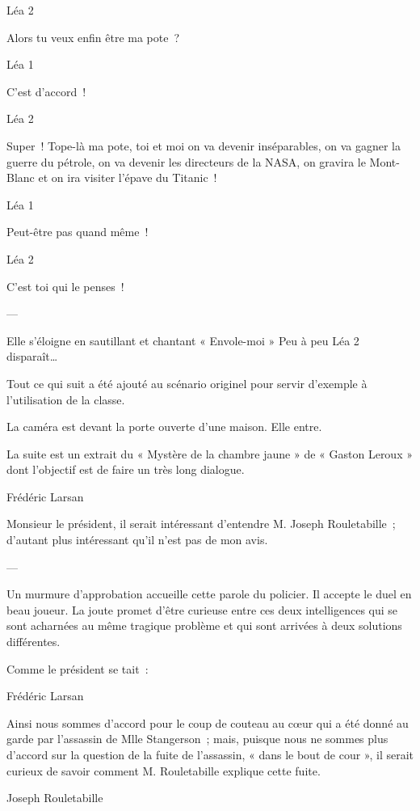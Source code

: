 \documentclass{frscenario}
\begin{document}
\— Léa 2

Alors tu veux enfin être ma pote ?

\— Léa 1

C’est d’accord !

\— Léa 2

Super ! Tope-là ma pote, toi et moi on va devenir inséparables, on va gagner la guerre du pétrole, on va devenir les directeurs de la NASA, on gravira le Mont-Blanc et on ira visiter l’épave du Titanic !

\— Léa 1

Peut-être pas quand même !

\— Léa 2

C’est toi qui le penses !

\——

Elle s’éloigne en sautillant et chantant « Envole-moi » Peu à peu Léa 2 disparaît…


Tout ce qui suit a été ajouté au scénario originel pour servir d'exemple à l'utilisation de la classe.

La caméra est devant la porte ouverte d'une maison. Elle entre.

La suite est un extrait du « Mystère de la chambre jaune » de « Gaston Leroux » dont l'objectif est de faire un très long dialogue.


\— Frédéric Larsan

Monsieur le président, il serait intéressant d’entendre M. Joseph Rouletabille ; d’autant plus intéressant qu’il n’est pas de mon avis.

\——

Un murmure d’approbation accueille cette parole du policier. Il accepte le duel en beau joueur. La joute promet d’être curieuse entre ces deux intelligences qui se sont acharnées au même tragique problème et qui sont arrivées à deux solutions différentes.

Comme le président se tait :

\— Frédéric Larsan

Ainsi nous sommes d’accord pour le coup de couteau au cœur qui a été donné au garde par l’assassin de Mlle Stangerson ; mais, puisque nous ne sommes plus d’accord sur la question de la fuite de l’assassin, « dans le bout de cour », il serait curieux de savoir comment M. Rouletabille explique cette fuite.

\— Joseph Rouletabille
\end{document}

